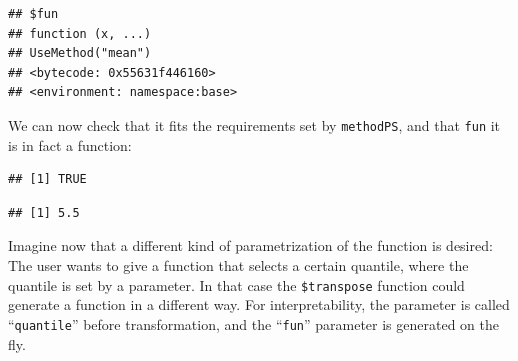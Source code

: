 \documentclass[
]{scrbook}
\newenvironment{Shaded}{\begin{snugshade}}{\end{snugshade}}
\newcommand{\AttributeTok}[1]{\textcolor[rgb]{0.77,0.63,0.00}{#1}}
\newcommand{\CommentTok}[1]{\textcolor[rgb]{0.56,0.35,0.01}{\textit{#1}}}
\newcommand{\ControlFlowTok}[1]{\textcolor[rgb]{0.13,0.29,0.53}{\textbf{#1}}}
\newcommand{\DecValTok}[1]{\textcolor[rgb]{0.00,0.00,0.81}{#1}}
\newcommand{\FunctionTok}[1]{\textcolor[rgb]{0.00,0.00,0.00}{#1}}
\newcommand{\NormalTok}[1]{#1}
\newcommand{\OtherTok}[1]{\textcolor[rgb]{0.56,0.35,0.01}{#1}}
\newcommand{\SpecialCharTok}[1]{\textcolor[rgb]{0.00,0.00,0.00}{#1}}
\newcommand{\StringTok}[1]{\textcolor[rgb]{0.31,0.60,0.02}{#1}}
\renewenvironment{Shaded} {\begin{snugshade}\small} {\end{snugshade}}
\begin{document}
\begin{verbatim}
## $fun
## function (x, ...) 
## UseMethod("mean")
## <bytecode: 0x55631f446160>
## <environment: namespace:base>
\end{verbatim}

We can now check that it fits the requirements set by \texttt{methodPS}, and that \texttt{fun} it is in fact a function:

\begin{Shaded}
\end{Shaded}

\begin{verbatim}
## [1] TRUE
\end{verbatim}

\begin{Shaded}
\end{Shaded}

\begin{verbatim}
## [1] 5.5
\end{verbatim}

Imagine now that a different kind of parametrization of the function is desired:
The user wants to give a function that selects a certain quantile, where the quantile is set by a parameter.
In that case the \texttt{\$transpose} function could generate a function in a different way.
For interpretability, the parameter is called ``\texttt{quantile}'' before transformation, and the ``\texttt{fun}'' parameter is generated on the fly.

\begin{Shaded}
\end{Shaded}
\end{document}
